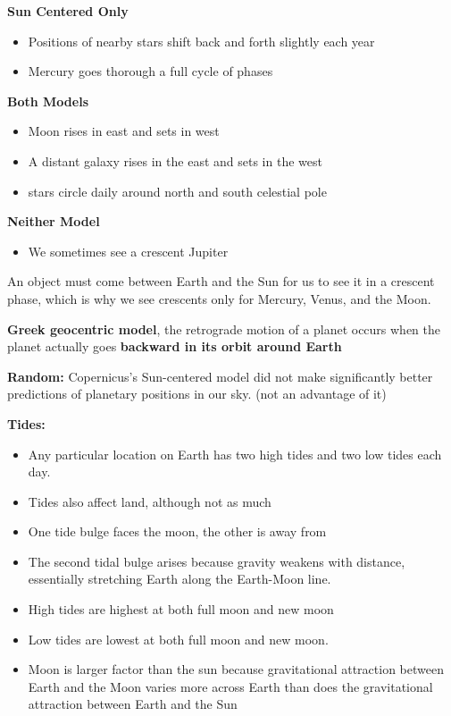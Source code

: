 {\bf Sun Centered Only}
\begin{itemize}
\item Positions of nearby stars shift back and forth slightly each year
\item Mercury goes thorough a full cycle of phases
\end{itemize}

{\bf Both Models}
\begin{itemize}
\item Moon rises in east and sets in west
\item A distant galaxy rises in the east and sets in the west
\item stars circle daily around north and south celestial pole
\end{itemize}

{\bf Neither Model}
\begin{itemize}
\item We sometimes see a crescent Jupiter
\end{itemize}

An object must come between Earth and the Sun for us to see it in a crescent phase, which is why we see crescents only for Mercury, Venus, and the Moon.

{\bf Greek geocentric model}, the retrograde motion of a planet occurs when the planet actually goes {\bf backward in its orbit around Earth }

{\bf Random:} Copernicus's Sun-centered model did not make significantly better predictions of planetary positions in our sky. (not an advantage of it)

{\bf Tides:}
\begin{itemize}
\item Any particular location on Earth has two high tides and two low tides each day.
\item Tides also affect land, although not as much
\item One tide bulge faces the moon, the other is away from
\item The second tidal bulge arises because gravity weakens with distance, essentially stretching Earth along the Earth-Moon line.
\item High tides are highest at both full moon and new moon
\item Low tides are lowest at both full moon and new moon.
\item Moon is larger factor than the sun because gravitational attraction between Earth and the Moon varies more across Earth than does the gravitational attraction between Earth and the Sun
\end{itemize}

